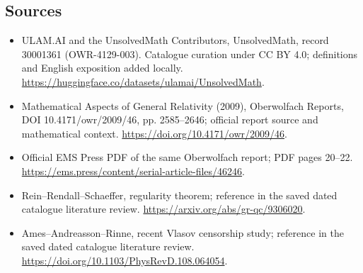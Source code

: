 \documentclass[11pt]{article}
\begin{document}
\subsection{Sources}
\begin{itemize}
\item[\hypertarget{source:30001361:1}{S1}] ULAM.AI and the UnsolvedMath Contributors, UnsolvedMath, record 30001361 (OWR-4129-003). Catalogue curation under CC BY 4.0; definitions and English exposition added locally.
\url{https://huggingface.co/datasets/ulamai/UnsolvedMath}.
\item[\hypertarget{source:30001361:2}{S2}] Mathematical Aspects of General Relativity (2009), Oberwolfach Reports, DOI 10.4171/owr/2009/46, pp. 2585--2646; official report source and mathematical context.
\url{https://doi.org/10.4171/owr/2009/46}.
\item[\hypertarget{source:30001361:3}{S3}] Official EMS Press PDF of the same Oberwolfach report; PDF pages 20--22.
\url{https://ems.press/content/serial-article-files/46246}.
\item[\hypertarget{source:30001361:4}{S4}] Rein--Rendall--Schaeffer, regularity theorem; reference in the saved dated catalogue literature review.
\url{https://arxiv.org/abs/gr-qc/9306020}.
\item[\hypertarget{source:30001361:5}{S5}] Ames--Andreasson--Rinne, recent Vlasov censorship study; reference in the saved dated catalogue literature review.
\url{https://doi.org/10.1103/PhysRevD.108.064054}.
\end{itemize}
\label{end:30001361}
\end{document}
